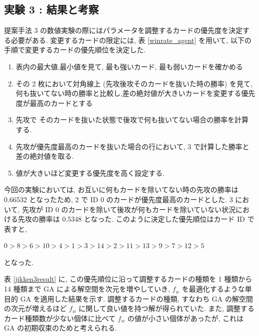 \documentclass[12pt]{jarticle}
\begin{document}
\subsection{実験 3 : 結果と考察}
提案手法 3 の数値実験の際にはパラメータを調整するカードの優先度を決定する必要がある.
変更するカードの限定には, 表 \ref{winrate_agent} を用いて, 以下の手順で変更するカードの優先順位を決定した. 
\begin{enumerate}
  \item 表内の最大値,最小値を見て, 最も強いカード, 最も弱いカードを確かめる
  \item その 2 枚において対角線上 (先攻後攻そのカードを抜いた時の勝率) を見て, 何も抜いてない時の勝率と比較し,差の絶対値が大きいカードを変更する優先度が最高のカードとする
  \item 先攻で そのカードを抜いた状態で後攻で何も抜いてない場合の勝率を計算する.
  \item 先攻が優先度最高のカードを抜いた場合の行において, 3 で計算した勝率と差の絶対値を取る. 
  \item 値が大きいほど変更する優先度を高く設定する.
\end{enumerate}
今回の実験においては, お互いに何もカードを除いてない時の先攻の勝率は 0.66532 となったため,  2 で ID 0 のカードが優先度最高のカードとした. 3 において, 先攻が ID 0 のカードを除いて後攻が何もカードを除いていない状況における先攻の勝率は 0.5348 となった. 
このように決定した優先順位はカード ID で表すと, \par
$0 > 8 > 6 > 10 > 4 > 1 > 3 > 14 > 2 > 11 > 13 > 9 > 7 > 12 > 5$ \par
となった. \par
表 \ref{jikken3result} に, この優先順位に沿って調整するカードの種類を 1 種類から 14 種類まで GA による解空間を次元を増やしていき, $f_w$ を最適化するような単目的 GA を適用した結果を示す.
調整するカードの種類, すなわち GA の解空間の次元が増えるほど $f_w$ に関して良い値を持つ解が得られていた. また, 調整するカード種類数が少ない個体に比べて $f_w$ の値が小さい個体があったが, これは GA の初期収束のためと考えられる.  \par
\end{document}
